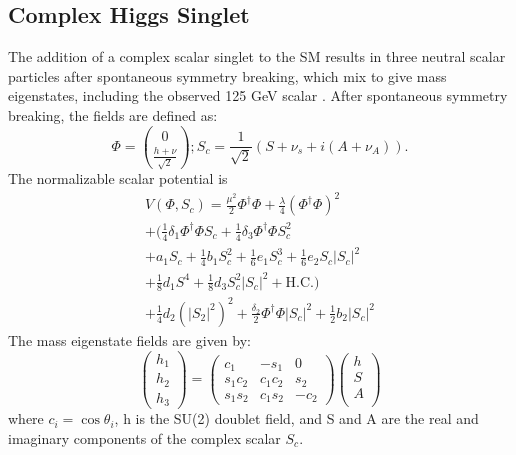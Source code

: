 \subsection{Complex Higgs Singlet}
The addition of a complex scalar singlet to the SM results in three neutral scalar particles after spontaneous symmetry breaking, which mix to give mass eigenstates, including the observed 125 GeV scalar \cite{PhysRevD.97.015022}.\newline
\indent After spontaneous symmetry breaking, the fields are defined as:
\begin{equation}
\Phi = \binom{0}{\frac{h+\nu}{\sqrt{2}}}; S_{c} = \frac{1}{\sqrt{2}}(S+\nu_{s} + i(A + \nu_{A})).
\end{equation}
The normalizable scalar potential is
\begin{equation}
\begin{split}
V(\Phi,S_{c}) = \frac{\mu^{2}}{2}\Phi^{\dagger}\Phi + \frac{\lambda}{4}(\Phi^{\dagger}\Phi)^{2} \\
+ (\frac{1}{4}\delta_{1}\Phi^{\dagger}\Phi{}S_{c} + \frac{1}{4}\delta_{3}\Phi^{\dagger}\Phi{}S_{c}^{2} \\
+ a_{1}S_{c} + \frac{1}{4}b_{1}S_{c}^{2} + \frac{1}{6}e_{1}S_{c}^{3} + \frac{1}{6}e_{2}S_{c}|S_{c}|^{2} \\
+ \frac{1}{8}d_{1}S^{4} + \frac{1}{8}d_{3}S_{c}^{2}|S_{c}|^{2} + \mathrm{H.C.}) \\
+ \frac{1}{4}d_{2}(|S_{2}|^{2})^{2} + \frac{\delta_{2}}{2}\Phi^{\dagger}\Phi|S_{c}|^{2} + \frac{1}{2}b_{2}|S_{c}|^{2}
\end{split}
\end{equation}
The mass eigenstate fields are given by:
\begin{equation}
\begin{pmatrix}
h_{1}\\
h_{2}\\
h_{3}
\end{pmatrix}
= \begin{pmatrix}
c_{1} & -s_{1} & 0\\
s_{1}c_{2} & c_{1}c_{2} & s_{2}\\
s_{1}s_{2} & c_{1}s_{2} & -c_{2}
\end{pmatrix} 
\begin{pmatrix}
h\\
S\\
A\\
\end{pmatrix}
\end{equation}
where ${c_{i} = \cos{\theta_{i}}}$, h is the SU(2) doublet field, and S and A are the real and imaginary components of the complex scalar ${S_{c}}$.
